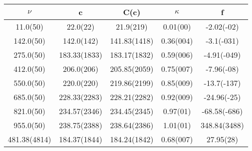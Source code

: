 \begin{table}[H]
	\centering
	\begin{tabular}{ccccc}
		$\nu$ & c & C(c) & $\kappa$ & f\\
		\hline
		11.0(50) & 22.0(22) & 21.9(219) & 0.01(00) & -2.02(-02)	\\
		142.0(50) & 142.0(142) & 141.83(1418) & 0.36(004) & -3.1(-031)	\\
		275.0(50) & 183.33(1833) & 183.17(1832) & 0.59(006) & -4.91(-049)	\\
		412.0(50) & 206.0(206) & 205.85(2059) & 0.75(007) & -7.96(-08)	\\
		550.0(50) & 220.0(220) & 219.86(2199) & 0.85(009) & -13.7(-137)	\\
		685.0(50) & 228.33(2283) & 228.21(2282) & 0.92(009) & -24.96(-25)	\\
		821.0(50) & 234.57(2346) & 234.45(2345) & 0.97(01) & -68.58(-686)	\\
		955.0(50) & 238.75(2388) & 238.64(2386) & 1.01(01) & 348.84(3488)	\\
		481.38(4814) & 184.37(1844) & 184.24(1842) & 0.68(007) & 27.95(28)	\\
	\end{tabular}
\end{table}